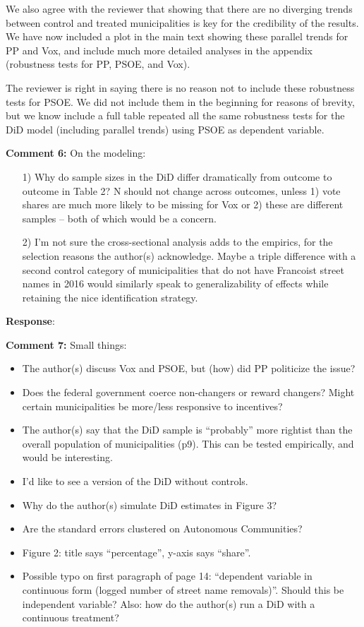 \documentclass[12pt, a4paper, notitlepage]{article}
\begin{document}
We also agree with the reviewer that showing that there are no diverging trends between control and treated municipalities is key for the credibility of the results.
We have now included a plot in the main text showing these parallel trends for PP and Vox, and include much more detailed analyses in the appendix (robustness tests for PP, PSOE, and Vox).

The reviewer is right in saying there is no reason not to include these robustness tests for PSOE. We did not include them in the beginning for reasons of brevity, but we know include a full table repeated all the same robustness tests for the DiD model (including parallel trends) using PSOE as dependent variable. \textbf{{\color{red}{-- discuss these models}}}

{}

\textbf{Comment 6:} On the modeling:
\begin{itemize}
  \item[1)] Why do sample sizes in the DiD differ dramatically from outcome to outcome in Table 2? N should not change across outcomes, unless 1) vote shares are much more likely to be missing for Vox or 2) these are different samples -- both of which would be a concern.
  \item[2)] I’m not sure the cross-sectional analysis adds to the empirics, for the selection reasons the author(s) acknowledge. Maybe a triple difference with a second control category of municipalities that do not have Francoist street names in 2016 would similarly speak to generalizability of effects while retaining the nice identification strategy.
\end{itemize}

\textbf{Response}: {\color{red}{pending}}

\textbf{Comment 7:} Small things:
\begin{itemize}
  \item The author(s) discuss Vox and PSOE, but (how) did PP politicize the issue?
  \item Does the federal government coerce non-changers or reward changers? Might certain
  municipalities be more/less responsive to incentives?
  \item The author(s) say that the DiD sample is “probably” more rightist than the overall
  population of municipalities (p9). This can be tested empirically, and would be
  interesting.
  \item I’d like to see a version of the DiD without controls.
  \item Why do the author(s) simulate DiD estimates in Figure 3?
  \item Are the standard errors clustered on Autonomous Communities?
  \item Figure 2: title says “percentage”, y-axis says “share”.
  \item Possible typo on first paragraph of page 14: “dependent variable in continuous form
  (logged number of street name removals)”. Should this be independent variable? Also: how do the author(s) run a DiD with a continuous treatment?
\end{itemize}
\end{document}

